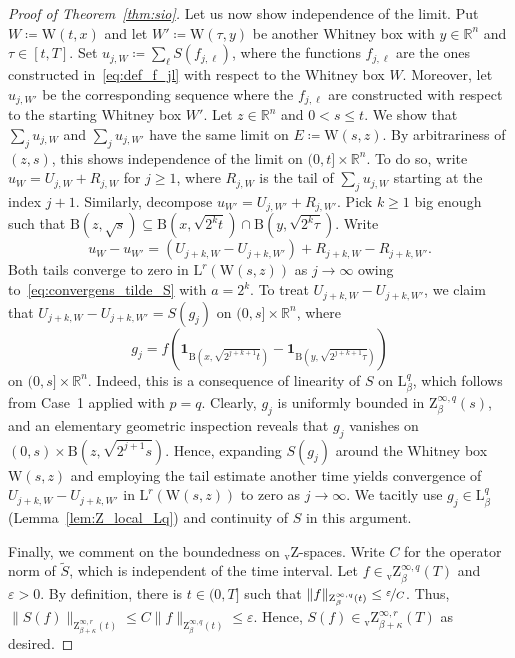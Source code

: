 \documentclass[11pt, leqno]{amsart}
\theoremstyle{definition}
\newcommand{\R}{\mathbb{R}}
\renewcommand{\L}{\mathrm{L}}
\newcommand{\Z}{\mathrm{Z}}
\newcommand{\Zv}{{}_\mathrm{v}\mathrm{Z}}
\newcommand{\WB}{\mathrm{W}}
\newcommand{\eps}{\varepsilon}
\newcommand{\B}{\mathrm{B}}
\newcommand{\ind}{\mathbf{1}}
\begin{document}
\begin{proof}[Proof of Theorem~\ref{thm:sio}]
		Let us now show independence of the limit. Put $W \coloneqq \WB(t,x)$ and let $W' \coloneqq \WB(\tau,y)$ be another Whitney box with $y\in \R^n$ and $\tau \in [t,T]$. Set $u_{j,W} \coloneqq \sum_\ell S(f_{j,\ell})$, where the functions $f_{j,\ell}$ are the ones constructed in~\eqref{eq:def_f_jl} with respect to the Whitney box $W$. Moreover, let $u_{j,W'}$ be the corresponding sequence where the $f_{j,\ell}$ are constructed with respect to the starting Whitney box $W'$. Let $z \in \R^n$ and $0 < s \leq t$. We show that $\sum_j u_{j,W}$ and $\sum_j u_{j,W'}$ have the same limit on $E \coloneqq \WB(s,z)$. By arbitrariness of $(z,s)$, this shows independence of the limit on $(0,t] \times \R^n$. To do so, write $u_W = U_{j,W} + R_{j,W}$ for $j \geq 1$, where $R_{j,W}$ is the tail of $\sum_j u_{j,W}$ starting at the index $j+1$. Similarly, decompose $u_{W'} = U_{j,W'} + R_{j,W'}$. Pick $k \geq 1$ big enough such that $\B(z,\sqrt{s}) \subseteq \B(x, \sqrt{2^k t}) \cap \B(y, \sqrt{2^k \tau})$. Write $$u_W - u_{W'} = (U_{j+k,W} - U_{j+k,W'}) + R_{j+k,W} - R_{j+k,W'}.$$ Both tails converge to zero in $\L^r(\WB(s,z))$ as $j\to \infty$ owing to~\eqref{eq:convergens_tilde_S} with $a = 2^k$. To treat $U_{j+k,W} - U_{j+k,W'}$, we claim that $U_{j+k,W} - U_{j+k,W'} = S(g_j)$ on $(0,s] \times \R^n$, where $$g_j = f(\ind_{\B(x,\sqrt{2^{j+k+1}t})} - \ind_{\B(y,\sqrt{2^{j+k+1}\tau})})$$ on $(0,s] \times \R^n$. Indeed, this is a consequence of linearity of $S$ on $\L^q_\beta$, which follows from Case~1 applied with $p = q$. Clearly, $g_j$ is uniformly bounded in $\Z^{\infty,q}_\beta(s)$, and an elementary geometric inspection reveals that $g_j$ vanishes on $(0,s) \times \B(z, \sqrt{2^{j+1} s})$. Hence, expanding $S(g_j)$ around the Whitney box $\WB(s,z)$ and employing the tail estimate another time yields convergence of $U_{j+k,W} - U_{j+k,W'}$ in $\L^r(\WB(s,z))$ to zero as $j \to \infty$. We tacitly use $g_j \in \L^q_\beta$ (Lemma~\ref{lem:Z_local_Lq}) and continuity of $S$ in this argument.

		Finally, we comment on the boundedness on $\Zv$-spaces. Write $C$ for the operator norm of $\tilde S$, which is independent of the time interval. Let $f \in \Zv^{\infty,q}_\beta(T)$ and $\eps > 0$. By definition, there is $t \in (0,T]$ such that $\| f \|_{\Z^{\infty,q}_\beta(t)} \leq \nicefrac{\eps}{C}$. Thus, $\| S(f) \|_{\Z^{\infty,r}_{\beta + \kappa}(t)} \leq C \| f \|_{\Z^{\infty,q}_\beta(t)} \leq \eps$. Hence, $S(f) \in \Zv^{\infty,r}_{\beta + \kappa}(T)$ as desired.
	\end{proof}
\end{document}
